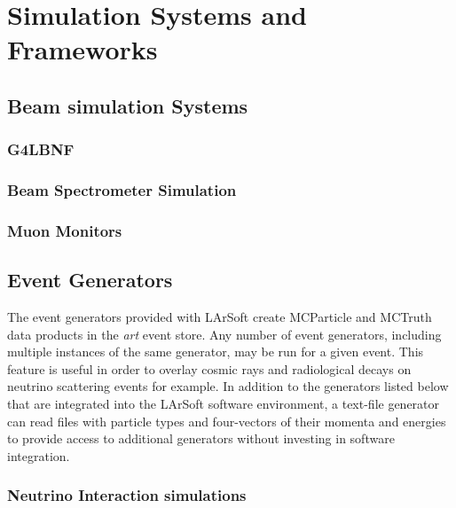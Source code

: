 %
\chapter{Simulation Systems and Frameworks}  %
\section{Beam simulation Systems}

\subsection{G4LBNF}

\subsection{Beam Spectrometer Simulation}

\subsection{Muon Monitors}

\section{Event Generators}

The event generators provided with LArSoft create MCParticle and MCTruth data products in
the {\it{art}} event store.  Any number of event generators, including multiple instances of the
same generator, may be run for a given event.  This feature is useful in order to overlay cosmic
rays and radiological decays on neutrino scattering events for example.  In addition to the
generators listed below that are integrated into the LArSoft software environment, a text-file generator
can read files with particle types and four-vectors of their momenta and energies to provide access
to additional generators without investing in software integration.

\subsection{Neutrino Interaction simulations}

